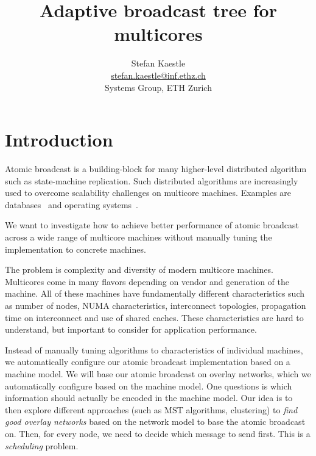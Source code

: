 \documentclass{article}
\begin{document}
\title{Adaptive broadcast tree for multicores}

\newcommand{\eaddr}{stefan.kaestle@inf.ethz.ch}
\newcommand{\email}{\href{mailto:\eaddr}{\eaddr}}

\author{Stefan Kaestle\\
  \email \\
  Systems Group, ETH Zurich}

\maketitle

\section{Introduction}

Atomic broadcast is a building-block for many higher-level distributed
algorithm such as state-machine replication. Such distributed
algorithms are increasingly used to overcome scalability challenges on
multicore machines. Examples are databases~\cite{Salomie2011,
  Wiesmann2000} and operating systems~\cite{fos:osr09, tornado:osdi99,
  barrelfish:sosp09}.

We want to investigate how to achieve better performance of atomic
broadcast across a wide range of multicore machines without manually
tuning the implementation to concrete machines.

The problem is complexity and diversity of modern multicore
machines. Multicores come in many flavors depending on vendor and
generation of the machine. All of these machines have fundamentally
different characteristics such as number of nodes, NUMA
characteristics, interconnect topologies, propagation time on
interconnect and use of shared caches. These characteristics are hard
to understand, but important to consider for application performance. 

Instead of manually tuning algorithms to characteristics of individual
machines, we automatically configure our atomic broadcast
implementation based on a machine model.
We will base our atomic broadcast on overlay networks, which we
automatically configure based on the machine model. One questions is
which information should actually be encoded in the machine model. %
Our idea is to then explore different approaches (such as MST
algorithms, clustering) to \emph{find good overlay networks} based on
the network model to base the atomic broadcast on. Then, for every
node, we need to decide which message to send first. This is a
\emph{scheduling} problem.
\end{document}
